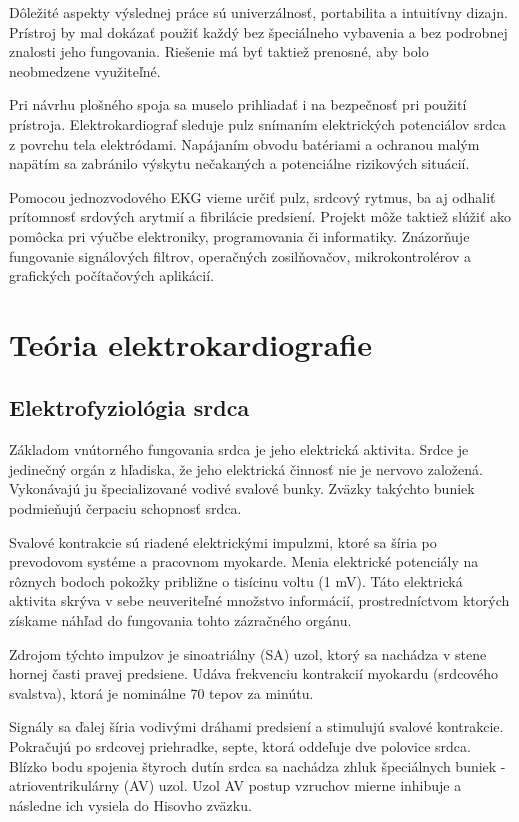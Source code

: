 \documentclass[titlepage]{article}
\begin{document}
Dôležité aspekty výslednej práce sú univerzálnosť, portabilita a intuitívny dizajn. Prístroj by mal dokázať použiť každý bez špeciálneho vybavenia a bez podrobnej znalosti jeho fungovania. Riešenie má byť taktiež prenosné, aby bolo neobmedzene využiteľné.

Pri návrhu plošného spoja sa muselo prihliadať i na bezpečnosť pri použití prístroja. Elektrokardiograf sleduje pulz snímaním elektrických potenciálov srdca z povrchu tela elektródami. Napájaním obvodu batériami a ochranou malým napätím sa zabránilo výskytu nečakaných a potenciálne rizikových situácií.

Pomocou jednozvodového EKG vieme určiť pulz, srdcový rytmus, ba aj odhaliť prítomnosť srdových arytmií a fibrilácie predsiení. Projekt môže taktiež slúžiť ako pomôcka pri výučbe elektroniky, programovania či informatiky. Znázorňuje fungovanie signálových filtrov, operačných zosilňovačov, mikrokontrolérov a grafických počítačových aplikácií.

\newpage
\section{Teória elektrokardiografie}
\subsection{Elektrofyziológia srdca}

Základom vnútorného fungovania srdca je jeho elektrická aktivita. Srdce je jedinečný orgán z hľadiska, že jeho elektrická činnosť nie je nervovo založená. Vykonávajú ju špecializované vodivé svalové bunky. Zväzky takýchto buniek podmieňujú čerpaciu schopnosť srdca.

Svalové kontrakcie sú riadené elektrickými impulzmi, ktoré sa šíria po prevodovom systéme a pracovnom myokarde. Menia elektrické potenciály na rôznych bodoch pokožky približne o tisícinu voltu (1 mV). Táto elektrická aktivita skrýva v sebe neuveriteľné množstvo informácií, prostredníctvom ktorých získame náhľad do fungovania tohto zázračného orgánu.

Zdrojom týchto impulzov je sinoatriálny (SA) uzol, ktorý sa nachádza v stene hornej časti pravej predsiene. Udáva frekvenciu kontrakcií myokardu (srdcového svalstva), ktorá je nominálne 70 tepov za minútu.

Signály sa ďalej šíria vodivými dráhami predsiení a stimulujú svalové kontrakcie. Pokračujú po srdcovej priehradke, septe, ktorá oddeľuje dve polovice srdca. Blízko bodu spojenia štyroch dutín srdca sa nachádza zhluk špeciálnych buniek - atrioventrikulárny (AV) uzol. Uzol AV postup vzruchov mierne inhibuje a následne ich vysiela do Hisovho zväzku.
\end{document}
